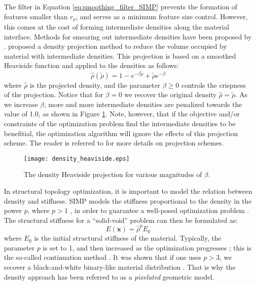The filter in Equation \ref{eq:smoothing_filter_SIMP} prevents the formation of features smaller than $r_{\rho}$, and serves as a minimum feature size control. However, this comes at the cost of forming intermediate densities along the material interface. Methods for smearing out intermediate densities have been proposed by \citep{FJP:05,Sigmund:07,SS:01a}. \citep{GPB:04} proposed a density projection method to reduce the volume occupied by material with intermediate densities. This projection is based on a smoothed Heaviside function and applied to the densities as follows:
%
\begin{equation}
\label{eq:heaviside_density}
		\hat{\rho}\left(\tilde{\rho}\right) = 1-e^{-\beta\tilde{\rho}}+\tilde{\rho}e^{-\beta}
\end{equation}
%
where $\hat{\rho}$ is the projected density, and the parameter $\beta \ge 0$ controls the crispness of the projection. Notice that for $\beta=0$ we recover the original density $\hat{\rho}=\tilde{\rho}$. As we increase $\beta$, more and more intermediate densities are penalized towards the value of 1.0, as shown in Figure \ref{fig:density_heaviside}. Note, however, that if the objective and/or constraints of the optimization problem find the intermediate densities to be benefitial, the optimization algorithm will ignore the effects of this projection scheme. The reader is referred to \citep{GPB:04,GAH:11,Sigmund:07,XCC:10,WLS:11} for more details on projection schemes.
%
\begin{figure}
	\centering
	\texttt{[image: density\_heaviside.eps]}
	\caption{The density Heaviside projection for various magnitudes of $\beta$.}
	\label{fig:density_heaviside}
\end{figure}
%
In structural topology optimization, it is important to model the relation between density and stiffness. SIMP models the stiffness proportional to the density in the power $p$, where $p > 1$ \citep{BS:99}, in order to guarantee a well-posed optimization problem \citep{BS:99}. The structural stiffness for a ``solid-void'' problem can then be formulated as:
%
\begin{equation}
\label{eq:structural_stiffness}
		E\left(\mathbf{x}\right) = \hat{\rho} ^ p E_{0}
\end{equation}
%
where $E_{0}$ is the initial structural stiffness of the material. Typically, the parameter $p$ is set to 1, and then increased as the optimization progresses \citep{RZS:94}; this is the so-called continuation method \citep{SP:98}. It was shown that if one uses $p > 3$, we recover a black-and-white binary-like material distribution \citep{BS:03}. That is why the density approach has been referred to as a \textit{pixelated} geometric model.


